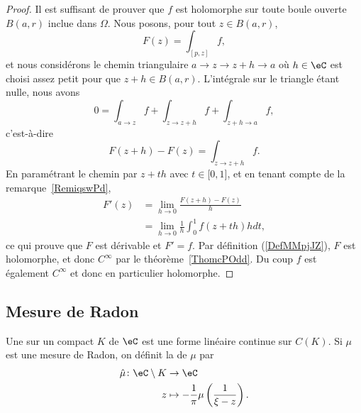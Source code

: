 \begin{proof}
	Il est suffisant de prouver que \( f\) est holomorphe sur toute boule ouverte \( B(a,r)\) inclue dans \( \Omega\). Nous posons, pour tout \( z\in B(a,r)\),
	\begin{equation}
		F(z)=\int_{[p,z]}f,
	\end{equation}
	et nous considérons le chemin triangulaire \( a\to z\to z+h\to a\) où \( h\in \eC\) est choisi assez petit pour que \( z+h\in B(a,r)\). L'intégrale sur le triangle étant nulle, nous avons
	\begin{equation}
		0=\int_{a\to z}f+\int_{z\to z+h}f+\int_{z+h\to a}f,
	\end{equation}
	c'est-à-dire
	\begin{equation}
		F(z+h)-F(z)=\int_{z\to z+h}f.
	\end{equation}
	En paramétrant le chemin par \( z+th\) avec \( t\in\mathopen[ 0 , 1 \mathclose]\), et en tenant compte de la remarque~\ref{RemiqswPd},
	\begin{subequations}
		\begin{align}
			F'(z) & =\lim_{h\to 0} \frac{ F(z+h)-F(z) }{ h }        \\
			      & =\lim_{h\to 0} \frac{1}{ h }\int_0^1f(z+th)hdt,
		\end{align}
	\end{subequations}
	ce qui prouve que \( F\) est dérivable et \( F'=f\). Par définition (\ref{DefMMpjJZ}), \( F\) est holomorphe, et donc \( C^{\infty}\) par le théorème~\ref{ThomcPOdd}. Du coup \( f\) est également \(  C^{\infty}\) et donc en particulier holomorphe.
\end{proof}

\subsection{Mesure de Radon}

\begin{definition}
	Une  sur un compact \(  K\) de \( \eC\) est une forme linéaire continue sur \( C(K)\). Si \( \mu\) est une mesure de Radon, on définit la  de \( \mu\) par
	\begin{equation}
		\begin{aligned}
			\hat \mu\colon \eC\setminus K & \to \eC                                                      \\
			z                             & \mapsto -\frac{1}{ \pi }\mu\left( \frac{1}{ \xi-z } \right).
		\end{aligned}
	\end{equation}
\end{definition}

